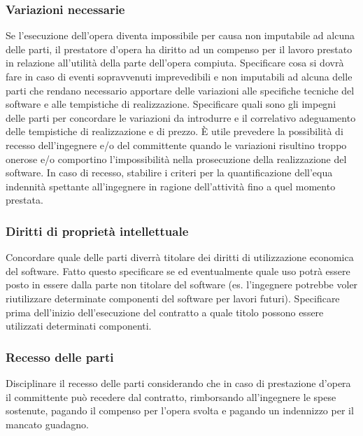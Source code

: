 \subsubsection{Variazioni necessarie}
Se l'esecuzione dell'opera diventa impossibile per causa non imputabile ad alcuna delle parti, il prestatore d'opera ha diritto ad un compenso per il lavoro
prestato in relazione all'utilità della parte dell'opera compiuta.\newline
Specificare cosa si dovrà fare in caso di eventi sopravvenuti imprevedibili e non imputabili ad alcuna delle parti che rendano necessario apportare delle variazioni
alle specifiche tecniche del software e alle tempistiche di realizzazione.\newline
Specificare quali sono gli impegni delle parti per concordare le variazioni da introdurre e il correlativo adeguamento
delle tempistiche di realizzazione e di prezzo.
È utile prevedere la possibilità di recesso dell'ingegnere e/o del committente quando le
variazioni risultino troppo onerose e/o comportino l'impossibilità nella prosecuzione della
realizzazione del software.\newline
In caso di recesso, stabilire i criteri per la quantificazione dell'equa indennità spettante all'ingegnere in ragione dell'attività
fino a quel momento prestata.

\subsubsection{Diritti di proprietà intellettuale}
Concordare quale delle parti diverrà titolare dei diritti di utilizzazione economica del software. Fatto questo specificare
se ed eventualmente quale uso potrà essere posto in essere dalla parte non titolare del software (es. l'ingegnere potrebbe
voler riutilizzare determinate componenti del software per lavori futuri). Specificare prima dell'inizio dell'esecuzione del contratto
a quale titolo possono essere utilizzati determinati componenti.

\subsubsection{Recesso delle parti}
Disciplinare il recesso delle parti considerando che in caso di prestazione d'opera il committente può
recedere dal contratto, rimborsando all'ingegnere le spese sostenute, pagando il compenso per l'opera svolta
e pagando un indennizzo per il mancato guadagno.

